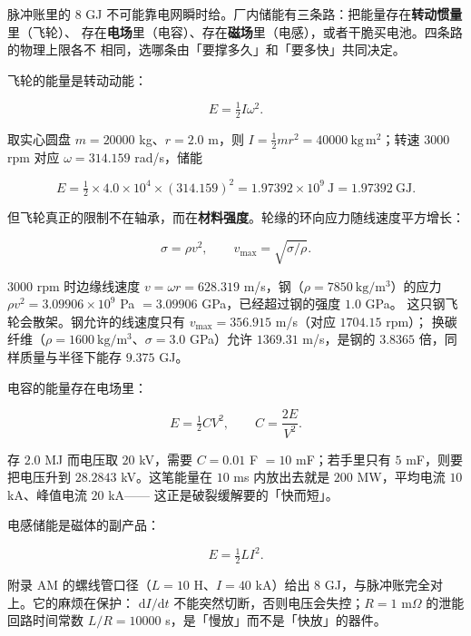 脉冲账里的 8 GJ 不可能靠电网瞬时给。厂内储能有三条路：把能量存在\textbf{转动惯量}里（飞轮）、
存在\textbf{电场}里（电容）、存在\textbf{磁场}里（电感），或者干脆买电池。四条路的物理上限各不
相同，选哪条由「要撑多久」和「要多快」共同决定。

飞轮的能量是转动动能：

\begin{equation}
E=\tfrac12 I\omega^2 .
\label{eq:app-ar-flywheel}
\end{equation}

取实心圆盘 $m=20000$ kg、$r=2.0$ m，则 $I=\tfrac12mr^2=40000\ \mathrm{kg\,m^2}$；转速
$3000$ rpm 对应 $\omega=314.159$ rad/s，储能

\begin{equation}
E=\tfrac12\times4.0\times10^{4}\times(314.159)^2=1.97392\times10^{9}\ \mathrm{J}=1.97392\ \mathrm{GJ}.
\label{eq:app-ar-flywheel2}
\end{equation}

但飞轮真正的限制不在轴承，而在\textbf{材料强度}。轮缘的环向应力随线速度平方增长：

\begin{equation}
\sigma=\rho v^2,\qquad v_\mathrm{max}=\sqrt{\sigma/\rho}.
\label{eq:app-ar-vmax}
\end{equation}

$3000$ rpm 时边缘线速度 $v=\omega r=628.319$ m/s，钢（$\rho=7850\ \mathrm{kg/m^3}$）的应力
$\rho v^2=3.09906\times10^{9}$ Pa $=3.09906$ GPa，已经超过钢的强度 $1.0$ GPa。
这只钢飞轮会散架。钢允许的线速度只有 $v_\mathrm{max}=356.915$ m/s（对应 $1704.15$ rpm）；
换碳纤维（$\rho=1600\ \mathrm{kg/m^3}$、$\sigma=3.0$ GPa）允许 $1369.31$ m/s，是钢的
$3.8365$ 倍，同样质量与半径下能存 $9.375$ GJ。

电容的能量存在电场里：

\begin{equation}
E=\tfrac12CV^2,\qquad C=\frac{2E}{V^2}.
\label{eq:app-ar-cap}
\end{equation}

存 $2.0$ MJ 而电压取 $20$ kV，需要 $C=0.01$ F $=10$ mF；若手里只有 $5$ mF，则要把电压升到
$28.2843$ kV。这笔能量在 $10$ ms 内放出去就是 $200$ MW，平均电流 $10$ kA、峰值电流 $20$ kA——
这正是破裂缓解要的「快而短」。

电感储能是磁体的副产品：

\begin{equation}
E=\tfrac12LI^2 .
\label{eq:app-ar-ind}
\end{equation}

附录 AM 的螺线管口径（$L=10$ H、$I=40$ kA）给出 $8$ GJ，与脉冲账完全对上。它的麻烦在保护：
$\mathrm{d}I/\mathrm{d}t$ 不能突然切断，否则电压会失控；$R=1$ m$\Omega$ 的泄能回路时间常数
$L/R=10000$ s，是「慢放」而不是「快放」的器件。

